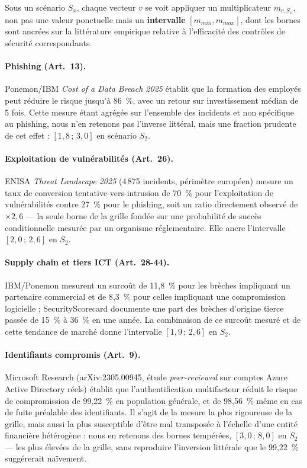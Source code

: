 \documentclass[11pt,a4paper]{article}
\theoremstyle{navystyle}
\theoremstyle{navydef}
\begin{document}
Sous un scénario $S_x$, chaque vecteur $v$ se voit appliquer un
multiplicateur $m_{v,S_x}$, non pas une valeur ponctuelle mais un
\textbf{intervalle} $[m_{min}, m_{max}]$, dont les bornes sont ancrées sur la
littérature empirique relative à l'efficacité des contrôles de sécurité
correspondants.

\paragraph{Phishing (Art.~13).} Ponemon/IBM \emph{Cost of a Data Breach
2025} établit que la formation des employés peut réduire le risque jusqu'à
86~\%, avec un retour sur investissement médian de 5 fois. Cette mesure
étant agrégée sur l'ensemble des incidents et non spécifique au phishing,
nous n'en retenons pas l'inverse littéral, mais une fraction prudente de cet
effet : $[1{,}8\,;\,3{,}0]$ en scénario $S_2$.

\paragraph{Exploitation de vulnérabilités (Art.~26).} ENISA \emph{Threat
Landscape 2025} (4\,875 incidents, périmètre européen) mesure un taux de
conversion tentative-vers-intrusion de 70~\% pour l'exploitation de
vulnérabilités contre 27~\% pour le phishing, soit un ratio directement
observé de $\times 2{,}6$ --- la seule borne de la grille fondée sur une
probabilité de succès conditionnelle mesurée par un organisme réglementaire.
Elle ancre l'intervalle $[2{,}0\,;\,2{,}6]$ en $S_2$.

\paragraph{Supply chain et tiers ICT (Art.~28-44).} IBM/Ponemon mesurent un
surcoût de 11{,}8~\% pour les brèches impliquant un partenaire commercial et
de 8{,}3~\% pour celles impliquant une compromission logicielle ;
SecurityScorecard documente une part des brèches d'origine tierce passée de
15~\% à 36~\% en une année. La combinaison de ce surcoût mesuré et de cette
tendance de marché donne l'intervalle $[1{,}9\,;\,2{,}6]$ en $S_2$.

\paragraph{Identifiants compromis (Art.~9).} Microsoft Research
(arXiv:2305.00945, étude \emph{peer-reviewed} sur comptes Azure Active
Directory réels) établit que l'authentification multifacteur réduit le
risque de compromission de 99{,}22~\% en population générale, et de
98{,}56~\% même en cas de fuite préalable des identifiants. Il s'agit de la
mesure la plus rigoureuse de la grille, mais aussi la plus susceptible
d'être mal transposée à l'échelle d'une entité financière hétérogène : nous
en retenons des bornes tempérées, $[3{,}0\,;\,8{,}0]$ en $S_2$ --- les plus
élevées de la grille, sans reproduire l'inversion littérale que le
99{,}22~\% suggérerait naïvement.
\end{document}
